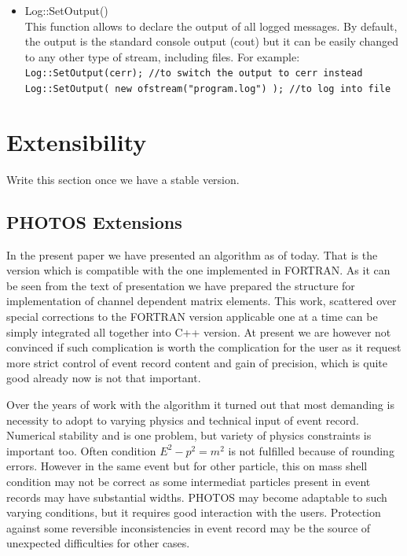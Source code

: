 \documentclass[]{Photos_interface_design}
\begin{document}
\begin{itemize}
 \item {Log::SetOutput() } \hfill \\
This function allows to declare the output of all logged messages. By default, the output is the standard console output (cout) but it can be easily changed to any other type of stream, including files. For example: \\
{\tt Log::SetOutput(cerr); //to switch the output to cerr instead} \\
{\tt Log::SetOutput( new ofstream("program.log") ); //to log into file}

\end{itemize}


\section{Extensibility}
Write this section once we have a stable version.
\subsection{PHOTOS Extensions}
In the present paper we have presented an algorithm as of today. 
That is the version which is compatible with the one implemented in FORTRAN.
As it can be seen from the text of presentation we have prepared the structure 
for implementation of channel dependent matrix elements. This work, scattered
 over special corrections to the FORTRAN version applicable one at a time can  
be simply integrated all together into C++ version.
 At present we are however not convinced if such complication is worth 
the complication for the user as it request more strict control of event 
record content and gain of precision, which is quite good already now is 
not that important. 

Over the years of work with the algorithm it turned out that most demanding is 
necessity to adopt to varying physics and technical input of event record.
Numerical stability and is one problem, but variety of physics constraints is 
important too. Often condition  $E^2-p^2=m^2$ is not fulfilled because of 
rounding errors. However in the same event but for other particle, this on 
mass shell 
condition may not be correct as some intermediat particles present in event 
records may have substantial widths. 
PHOTOS may become adaptable to such varying conditions, but it requires
good interaction with the users. Protection against some reversible
inconsistencies in event record may be the source of unexpected difficulties
for other cases. 
\end{document}
